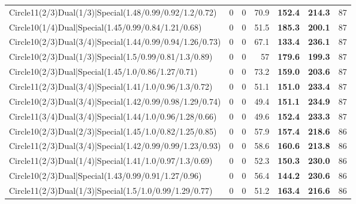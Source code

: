\begin{tabular}{lrrrllr}
 Circle11(2/3)Dual(1/3)|Special(1.48/0.99/0.92/1.2/0.72)        &          0   &            0   &          70.9 & \textbf{152.4} & \textbf{214.3} &           87 \\
 Circle10(1/4)Dual|Special(1.45/0.99/0.84/1.21/0.68)            &          0   &            0   &          51.5 & \textbf{185.3} & \textbf{200.1} &           87 \\
 Circle10(2/3)Dual(3/4)|Special(1.44/0.99/0.94/1.26/0.73)       &          0   &            0   &          67.1 & \textbf{133.4} & \textbf{236.1} &           87 \\
 Circle10(2/3)Dual(1/3)|Special(1.5/0.99/0.81/1.3/0.89)         &          0   &            0   &          57   & \textbf{179.6} & \textbf{199.3} &           87 \\
 Circle10(2/3)Dual|Special(1.45/1.0/0.86/1.27/0.71)             &          0   &            0   &          73.2 & \textbf{159.0} & \textbf{203.6} &           87 \\
 Circle11(2/3)Dual(3/4)|Special(1.41/1.0/0.96/1.3/0.72)         &          0   &            0   &          51.1 & \textbf{151.0} & \textbf{233.4} &           87 \\
 Circle10(2/3)Dual(3/4)|Special(1.42/0.99/0.98/1.29/0.74)       &          0   &            0   &          49.4 & \textbf{151.1} & \textbf{234.9} &           87 \\
 Circle11(3/4)Dual(3/4)|Special(1.44/1.0/0.96/1.28/0.66)        &          0   &            0   &          49.6 & \textbf{152.4} & \textbf{233.3} &           87 \\
 Circle10(2/3)Dual(2/3)|Special(1.45/1.0/0.82/1.25/0.85)        &          0   &            0   &          57.9 & \textbf{157.4} & \textbf{218.6} &           86 \\
 Circle11(2/3)Dual(3/4)|Special(1.42/0.99/0.99/1.23/0.93)       &          0   &            0   &          58.6 & \textbf{160.6} & \textbf{213.8} &           86 \\
 Circle11(2/3)Dual(1/4)|Special(1.41/1.0/0.97/1.3/0.69)         &          0   &            0   &          52.3 & \textbf{150.3} & \textbf{230.0} &           86 \\
 Circle10(2/3)Dual|Special(1.43/0.99/0.91/1.27/0.96)            &          0   &            0   &          56.4 & \textbf{144.2} & \textbf{230.6} &           86 \\
 Circle11(2/3)Dual(1/3)|Special(1.5/1.0/0.99/1.29/0.77)         &          0   &            0   &          51.2 & \textbf{163.4} & \textbf{216.6} &           86 \\

\end{tabular}
